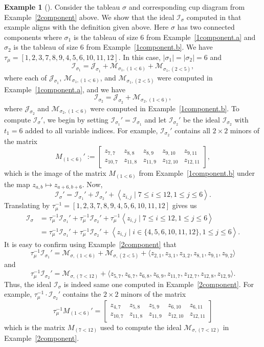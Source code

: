\documentclass[11pt]{amsart}
\theoremstyle{remark}
\theoremstyle{remark}
\theoremstyle{definition}
\theoremstyle{definition}
\theoremstyle{definition}
\newtheorem{eg_no_qed}[theorem]{Example}
\newenvironment{ex}[1][]{\begin{eg_no_qed}[#1]\renewcommand{\qedsymbol}{$\Diamond$}\pushQED{\qed}}{\popQED\end{eg_no_qed}}
\numberwithin{equation}{section}
\newcommand{\gs}{\sigma}
\newcommand{\ci}{\mathcal{I}}
\newcommand{\cj}{\mathcal{J}}
\newcommand{\cm}{\mathcal{M}}
\newcommand{\parsum}{t}
\begin{document}
\begin{ex} \label{ex.2component.cont} Consider the tableau $\gs$ and corresponding cup diagram from Example~\ref{2component} above. We show that the ideal $\ci_\gs$ computed in that example aligns with the definition given above. Here $\gs$ has two connected components where $\gs_1$ is the tableau of size $6$ from Example~\ref{1component.a} and $\gs_2$ is the tableau of size $6$ from Example~\ref{1component.b}. We have $\tau_\mu =[1,2,3,7,8,9,4,5,6,10,11,12]$.  In this case, $|\gs_1|=|\gs_2|=6$ and 
\[
\ci_{\gs_1} = \cj_{\gs_1}+ \cm_{\gs_1,(1<6)}+\cm_{\gs_1, (2<5)},
\]
where each of $\cj_{\gs_1}$, $\cm_{\gs_1,(1<6)}$, and $\cm_{\gs_1, (2<5)}$ were computed in Example~\ref{1component.a}, and we have 
\[
\ci_{\gs_2} = \cj_{\gs_2}+ \cm_{\gs_2,(1<6)},
\]
where $\cj_{\gs_2}$ and $\cm_{\gs_2,(1<6)}$ were computed in Example~\ref{1component.b}. To compute $\ci_\gs'$, we begin by setting $\ci_{\gs_1}'=\ci_{\gs_1}$ and let $\ci_{\gs_2}'$ be the ideal $\ci_{\gs_2}$ with $\parsum_1=6$ added to all variable indices. For example, $\ci_{\gs_2}'$ contains all $2\times 2$ minors of the matrix
\[
M_{(1<6)}':=\begin{bmatrix} z_{7,7}& z_{8,8}& z_{8,9} & z_{9,10} &z_{9,11}\\ z_{10,7}& z_{11,8}& z_{11,9} & z_{12,10} &z_{12,11}
\end{bmatrix},
\]
which is the image of the matrix $M_{(1<6)}$ from Example~\ref{1component.b} under the map $z_{a,b}\mapsto z_{a+6,b+6}$. Now,
\[
\ci_\gs' = \ci_{\gs_1}'+\ci_{\gs_2}' + \left< z_{i,j} \mid 7\leq i \leq 12, 1 \leq j \leq 6\right>.
\]
Translating by $\tau_\mu^{-1} = [1,2,3,7,8,9,4,5,6,10,11,12]$ gives us 
\begin{align*}
\ci_\gs &= \tau_\mu^{-1}\ci_{\gs_1}'+ \tau_\mu^{-1}\ci_{\gs_2}' + \tau_\mu^{-1}\left< z_{i,j} \mid 7\leq i \leq 12, 1 \leq j \leq 6\right>\\
&= \tau_\mu^{-1}\ci_{\gs_1}'+ \tau_\mu^{-1}\ci_{\gs_2}' +\left< z_{i,j} \mid i\in \{4,5,6,10,11,12\}, 1 \leq j \leq 6\right>.
\end{align*}
It is easy to confirm using Example~\ref{2component} that
\[
\tau_\mu^{-1}\ci_{\gs_1}' = \cm_{\gs,(1<6)}+\cm_{\gs, (2<5)}+ \langle z_{2,1}, z_{3,1}, z_{3,2}, z_{8,1}, z_{9,1}, z_{9,2} \rangle
\]
and 
\[
\tau_\mu^{-1}\ci_{\gs_2}' = \cm_{\gs,(7<12)}+ \langle z_{5,7}, z_{6,7}, z_{6,8}, z_{6,9}, z_{11,7}, z_{12,7}, z_{12, 8}, z_{12,9} \rangle.
\]
Thus, the ideal $\ci_\gs$ is indeed same one computed in Example~\ref{2component}. For example, $\tau_\mu^{-1}\cdot\ci_{\gs_2}'$ contains the $2\times 2$ minors of the matrix 
\[
\tau_\mu^{-1}  M_{(1<6)}' = \begin{bmatrix} z_{4,7}& z_{5,8}& z_{5,9} & z_{6,10} &z_{6,11}\\ z_{10,7}& z_{11,8}& z_{11,9} & z_{12,10} &z_{12,11}
\end{bmatrix}
\]
which is the matrix $M_{(7<12)}$ used to compute the ideal $\cm_{\gs,(7<12)}$ in Example~\ref{2component}.
\end{ex}
\end{document}
